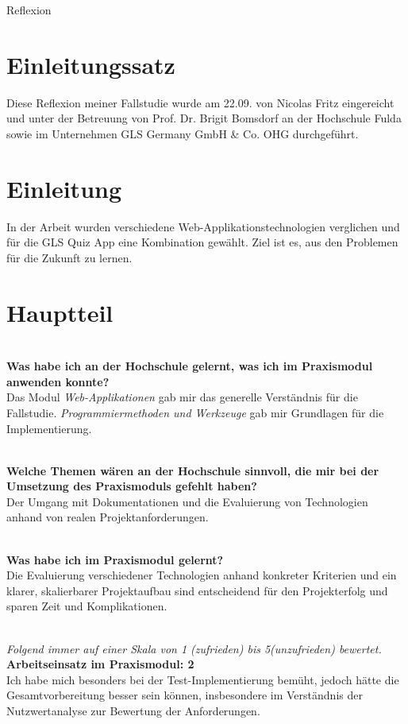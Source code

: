 \documentclass[biblatex]{lni}
\begin{document}
  \begin{center}
     \LARGE Reflexion
  \end{center}

  \section{Einleitungssatz}

  Diese Reflexion meiner Fallstudie wurde am 22.09. von Nicolas Fritz eingereicht und unter der Betreuung von Prof. Dr. Brigit Bomsdorf an der Hochschule Fulda sowie im Unternehmen GLS Germany GmbH & Co. OHG durchgeführt.

  \section{Einleitung}

  In der Arbeit wurden verschiedene Web-Applikationstechnologien verglichen und für die GLS Quiz App eine Kombination gewählt.
  Ziel ist es, aus den Problemen für die Zukunft zu lernen.

  \section{Hauptteil}

  \\ \textbf{Was habe ich an der Hochschule gelernt, was ich im Praxismodul anwenden konnte?} \\
  Das Modul \textit{Web-Applikationen} gab mir das generelle Verständnis für die Fallstudie.
  \textit{Programmiermethoden und Werkzeuge} gab mir Grundlagen für die Implementierung.

  \\ \textbf{Welche Themen wären an der Hochschule sinnvoll, die mir bei der Umsetzung des Praxismoduls gefehlt haben?} \\
  Der Umgang mit Dokumentationen und die Evaluierung von Technologien anhand von realen Projektanforderungen.

  \\ \textbf{Was habe ich im Praxismodul gelernt?} \\
  Die Evaluierung verschiedener Technologien anhand konkreter Kriterien und ein klarer,
  skalierbarer Projektaufbau sind entscheidend für den Projekterfolg und sparen Zeit und Komplikationen.

  \\ \textit{Folgend immer auf einer Skala von 1 (zufrieden) bis 5(unzufrieden) bewertet.}
  \\ \textbf{Arbeitseinsatz im Praxismodul: 2}\\
  Ich habe mich besonders bei der Test-Implementierung bemüht,
  jedoch hätte die Gesamtvorbereitung besser sein können,
  insbesondere im Verständnis der Nutzwertanalyse zur Bewertung der Anforderungen.
\end{document}
